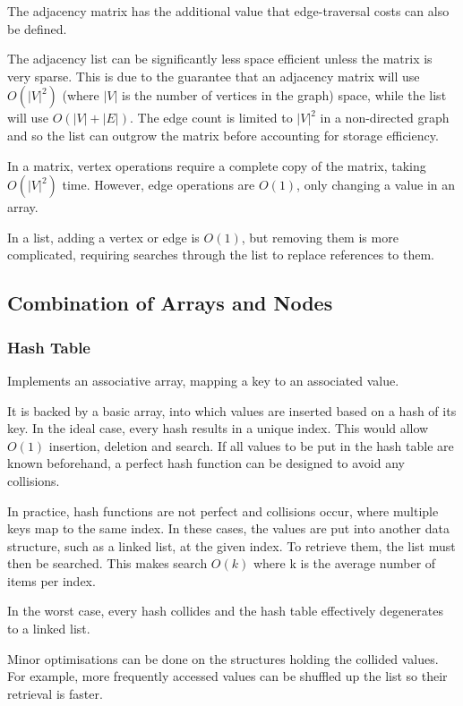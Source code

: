 \documentclass[]{article}
\begin{document}
The adjacency matrix has the additional value that edge-traversal costs can also be defined.

The adjacency list can be significantly less space efficient unless the matrix is very sparse. This is due to the guarantee that an adjacency matrix will use $O(|V|^{2})$ (where $|V|$ is the number of vertices in the graph) space, while the list will use $O(|V| + |E|)$. The edge count is limited to $|V|^{2}$ in a non-directed graph and so the list can outgrow the matrix before accounting for storage efficiency.

In a matrix, vertex operations require a complete copy of the matrix, taking $O(|V|^{2})$ time. However, edge operations are $O(1)$, only changing a value in an array.

In a list, adding a vertex or edge is $O(1)$, but removing them is more complicated, requiring searches through the list to replace references to them.

\pagebreak

\subsection{Combination of Arrays and Nodes}

\subsubsection{Hash Table}

Implements an associative array, mapping a key to an associated value.

It is backed by a basic array, into which values are inserted based on a hash of its key. In the ideal case, every hash results in a unique index. This would allow $O(1)$ insertion, deletion and search. If all values to be put in the hash table are known beforehand, a perfect hash function can be designed to avoid any collisions.

In practice, hash functions are not perfect and collisions occur, where multiple keys map to the same index. In these cases, the values are put into another data structure, such as a linked list, at the given index. To retrieve them, the list must then be searched. This makes search $O(k)$ where k is the average number of items per index.

In the worst case, every hash collides and the hash table effectively degenerates to a linked list.

Minor optimisations can be done on the structures holding the collided values. For example, more frequently accessed values can be shuffled up the list so their retrieval is faster.
\end{document}
